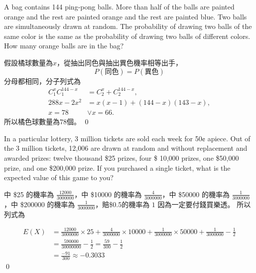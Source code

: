 \begin{exercise}[2.1-19]
    A bag contains 144 ping-pong balls. More than half of the balls are painted orange and the rest are painted orange and the rest are painted blue. Two balls are simultaneously drawn at random.
     The probability of drawing two balls of the same color is the same as the probability of drawing two balls of different colors. How many orange balls are in the bag?
\end{exercise}
\begin{solution}
假設橘球數量為$x$，從抽出同色與抽出異色機率相等出手，
$$
P(\text{同色})=P(\text{異色})
$$
分母都相同，分子列式為
$$\begin{aligned}
C^x_1C^{144-x}_1&=C^x_2+C^{144-x}_2,\\
288x-2x^2&=x(x-1)+(144-x)(143-x),\\
x=78 &\lor x=66.
\end{aligned}$$
所以橘色球數量為$78$個。
\qed
\end{solution}
\begin{exercise}[2.2-3]
    In a particular lottery, 3 million tickets are sold each week for 50¢ apiece. Out of the 3 million tickets, 12,006 are drawn at random and without replacement 
    and awarded prizes: twelve thousand \$25 prizes, four \$ 10,000 prizes, one \$50,000 prize, and one \$200,000 prize. If you purchased a single ticket, what is the expected value 
    of this game to you?
\end{exercise}
\begin{solution}
中 \$25 的機率為 $\frac{12000}{3000000}$，中 \$10000 的機率為 $\frac{4}{3000000}$，中 \$50000 的機率為 $\frac{1}{3000000}$，中 \$200000 的機率為 $\frac{1}{3000000}$，賠\$0.5的機率為 $1$ 因為一定要付錢買樂透。
所以列式為

$$
\begin{aligned}
E(X)&=\frac{12000}{3000000}\times 25+\frac{4}{3000000}\times 10000+\frac{1}{3000000}\times 50000+\frac{1}{3000000}-\frac{1}{2}\\
&=\frac{590000}{30000000}-\frac{1}{2}=\frac{59}{300}-\frac{1}{2}\\
&=\frac{-91}{300}\approx -0.3033
\end{aligned}$$
\qed
\end{solution}
